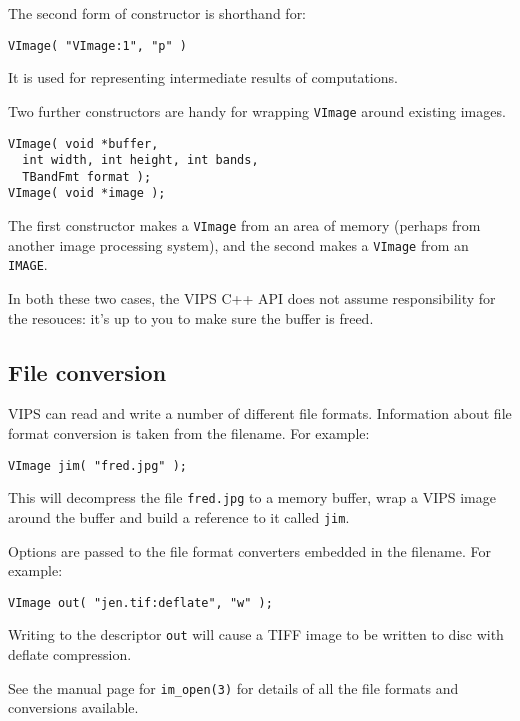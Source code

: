 The second form of constructor is shorthand for:

\begin{verbatim}
VImage( "VImage:1", "p" )
\end{verbatim}

\noindent
It is used for representing intermediate results of computations.

Two further constructors are handy for wrapping \verb+VImage+ around existing
images.

\begin{verbatim}
VImage( void *buffer, 
  int width, int height, int bands, 
  TBandFmt format );
VImage( void *image );
\end{verbatim}

\noindent
The first constructor makes a \verb+VImage+ from an area of memory (perhaps
from another image processing system), and the second makes a \verb+VImage+
from an \verb+IMAGE+. 

In both these two cases, the VIPS C++ API does not assume responsibility
for the resouces: it's up to you to make sure the buffer is freed.

\subsection{File conversion}

VIPS can read and write a number of different file formats. Information about
file format conversion is taken from the filename. For example:

\begin{verbatim}
VImage jim( "fred.jpg" );
\end{verbatim}

\noindent
This will decompress the file \verb+fred.jpg+ to a memory buffer, wrap a VIPS
image around the buffer and build a reference to it called \verb+jim+.

Options are passed to the file format converters embedded in the filename. For
example:

\begin{verbatim}
VImage out( "jen.tif:deflate", "w" );
\end{verbatim}

\noindent

\noindent
Writing to the descriptor \verb+out+ will cause a TIFF image to be written to
disc with deflate compression.

See the manual page for \verb+im_open(3)+ for details of all the file formats
and conversions available.

